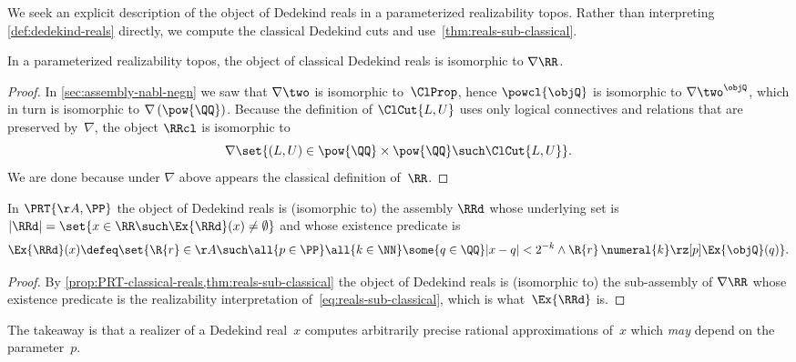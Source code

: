 We seek an explicit description of the object of Dedekind reals in a parameterized realizability topos. Rather than interpreting \cref{def:dedekind-reals} directly, we compute the classical Dedekind cuts and use~\cref{thm:reals-sub-classical}.

\begin{proposition}
  \label{prop:PRT-classical-reals}%
  In a parameterized realizability topos, the object of classical Dedekind reals is isomorphic to $\nabla\RR$.
\end{proposition}

\begin{proof}
  In \cref{sec:assembly-nabl-negn} we saw that $\nabla\two$ is isomorphic to~$\ClProp$,
  hence $\powcl{\objQ}$ is isomorphic to ${\nabla\two}^\objQ$, which in turn is isomorphic to $\nabla\left(\pow{\QQ}\right)$.
  Because the definition of $\ClCut{L,U}$ uses only logical connectives and relations that
  are preserved by~$\nabla$, the object $\RRcl$ is isomorphic to
  \begin{equation*}
    \nabla \set{(L, U) \in \pow{\QQ} \times \pow{\QQ} \such \ClCut{L, U}}.
  \end{equation*}
  We are done because under $\nabla$ above appears the classical definition of~$\RR$.
\end{proof}

\begin{corollary}
  \label{cor:dedekind-characterization}%
  In $\PRT{\AA, \PP}$ the object of Dedekind reals is (isomorphic to) the assembly $\RRd$ whose underlying set is
  $
    |\RRd| = \set{x \in \RR \such \Ex{\RRd}(x) \neq \emptyset}
  $
  and whose existence predicate is
  \begin{equation*}
    \Ex{\RRd}(x) \defeq
    \set{\R{r} \in \AA \such
      \all{p \in \PP}
      \all{k \in \NN}
      \some{q \in \QQ}
      |x - q| < 2^{-k} \land
      \R{r} \, \numeral{k} \rz[p] \Ex{\objQ}(q)
    }.
  \end{equation*}
\end{corollary}

\begin{proof}
  By \cref{prop:PRT-classical-reals,thm:reals-sub-classical} the object of Dedekind reals is (isomorphic to) the
  sub-assembly of $\nabla{\RR}$ whose existence predicate is the realizability interpretation of~\eqref{eq:reals-sub-classical}, which is what~$\Ex{\RRd}$ is.
\end{proof}

The takeaway is that a realizer of a Dedekind real~$x$ computes arbitrarily precise rational approximations of~$x$ which \emph{may} depend on the parameter~$p$.

